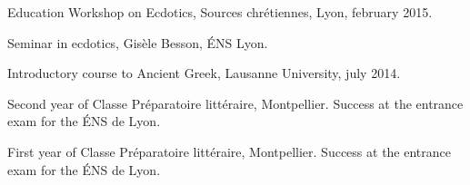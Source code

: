 \begin{rubric}{Education}
                                \entry*
                            Workshop on Ecdotics, Sources chrétiennes, Lyon, february
                        2015.
                    
                                \entry*[2013-2014]
                            Seminar in ecdotics, Gisèle Besson, ÉNS Lyon.
                    
                                \entry*
                            Introductory course to Ancient Greek, Lausanne University, july
                        2014.
                    
                                \entry*[2012-2013]
                            Second year of Classe Préparatoire littéraire, Montpellier. Success at
                        the entrance exam for the ÉNS de Lyon.
                    
                                \entry*[2011-2012]
                            First year of Classe Préparatoire littéraire, Montpellier. Success at
                        the entrance exam for the ÉNS de Lyon.
                    \end{rubric}





